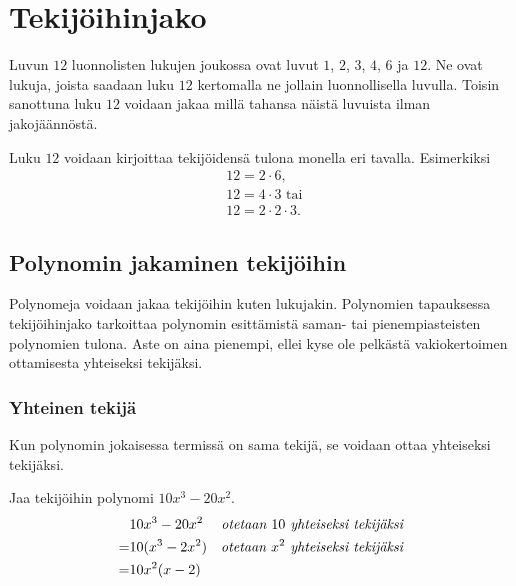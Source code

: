 \section{Tekijöihinjako}




Luvun $12$  luonnolisten lukujen joukossa ovat luvut $1$, $2$, $3$, $4$, $6$ ja $12$. Ne ovat
lukuja, joista saadaan luku $12$ kertomalla ne jollain luonnollisella luvulla. Toisin sanottuna luku $12$ voidaan jakaa
millä tahansa näistä luvuista ilman jakojäännöstä.

\begin{esimerkki}
Luku $12$ voidaan kirjoittaa tekijöidensä tulona monella eri tavalla. Esimerkiksi
\begin{align*}
&12 = 2 \cdot 6, \\
&12= 4 \cdot 3 \text{ tai } \\
&12= 2 \cdot 2 \cdot 3.
\end{align*}
\end{esimerkki}

\subsection*{Polynomin jakaminen tekijöihin}


Polynomeja voidaan jakaa tekijöihin kuten lukujakin. Polynomien tapauksessa tekijöihinjako tarkoittaa
polynomin esittämistä saman- tai pienempiasteisten polynomien tulona. Aste on aina pienempi, ellei kyse ole pelkästä
vakiokertoimen ottamisesta yhteiseksi tekijäksi.

\subsubsection*{Yhteinen tekijä}

Kun polynomin jokaisessa termissä on sama tekijä, se voidaan ottaa yhteiseksi tekijäksi.

\begin{esimerkki}
Jaa tekijöihin polynomi $10x^3-20x^2$.
\begin{align*}
& 10x^3-20x^2 &\emph{otetaan $10$ yhteiseksi tekijäksi}\\
=& 10(x^3-2x^2) &\emph{otetaan $x^2$ yhteiseksi tekijäksi} \\
=& 10x^2(x-2)  
\end{align*}
\end{esimerkki}

